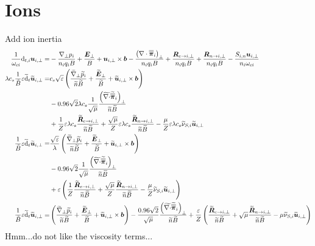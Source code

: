 \section{Ions}
%
Add ion inertia
%
\begin{align*}
 \frac{1}{\om_{ci}}\d_{t,i} \ve{u}_{i,\perp}
 =&
 - \frac{ \grad_\perp p_i }{n_i  q_i B}
 + \frac{\ve{E}_\perp}{B}
 + \ve{u}_{i,\perp}\times\ve{b}
 - \frac{ \L(\div\te{\pi}_i\R)_\perp }{n_i  q_i B}
 + \frac{ \ve{R}_{e \to i,\perp} }{n_i q_i B}
 + \frac{ \ve{R}_{n \to i,\perp} }{n_i q_i B}
 - \frac{ S_{i,n}\ve{u}_{i,\perp} }{n_i \om_{ci}}
 \\
 \lambda c_s
 \frac{1}{\tilde{B}}
 \e \wt{\d}_{t}\wt{\ve{u}}_{i,\perp}
 =&
c_s
\sqrt{\e}
\L(
\frac{ \wt{\grad}_\perp \wt{p}_i}{\wt{n} \wt{B}}
+
\frac{\wt{\ve{E}}_\perp}{\wt{B}}
+
\wt{\ve{u}}_{i,\perp}\times\ve{b}
\R)
\\ &
-
0.96\sqrt{2} \lambda c_s \frac{1}{\sqrt{\mu}} \frac{\L(\wt{\div}\wt{\te{\pi}}_i\R)_\perp}{\wt{n}\wt{B}}
\\ &
+ \frac{1}{Z}\e\lambda c_s \frac{\wt{\ve{R}}_{e \to i,\perp} }{\wt{n}\wt{B}}
 + \frac{\sqrt{\mu}}{Z} \e \lambda c_s \frac{\wt{\ve{R}}_{n \to i,\perp} }{\wt{n} \wt{B}}
 - \frac{\mu}{Z} \e\lambda c_s \wt{\nu}_{S,i}\wt{\ve{u}}_{i,\perp}
 \\
 \frac{1}{\tilde{B}}
 \e \wt{\d}_{t}\wt{\ve{u}}_{i,\perp}
 =&
\frac{\sqrt{\e}}{\lambda}
\L(
\frac{ \wt{\grad}_\perp \wt{p}_i}{\wt{n} \wt{B}}
+
\frac{\wt{\ve{E}}_\perp}{\wt{B}}
+
\wt{\ve{u}}_{i,\perp}\times\ve{b}
\R)
\\ &
-
0.96\sqrt{2} \frac{1}{\sqrt{\mu}} \frac{\L(\wt{\div}\wt{\te{\pi}}_i\R)_\perp}{\wt{n}\wt{B}}
\\ &
+ \e\L(\frac{1}{Z} \frac{\wt{\ve{R}}_{e \to i,\perp} }{\wt{n}\wt{B}}
+ \frac{\sqrt{\mu}}{Z}   \frac{\wt{\ve{R}}_{n \to i,\perp} }{\wt{n} \wt{B}}
- \frac{\mu}{Z}  \wt{\nu}_{S,i}\wt{\ve{u}}_{i,\perp}\R)
\\
 \frac{1}{\tilde{B}}
 \e \wt{\d}_{t}\wt{\ve{u}}_{i,\perp}
 =&
\L(
\frac{ \wt{\grad}_\perp \wt{p}_i}{\wt{n} \wt{B}}
+
\frac{\wt{\ve{E}}_\perp}{\wt{B}}
+
\wt{\ve{u}}_{i,\perp}\times\ve{b}
\R)
-
\frac{0.96\sqrt{2}}{\sqrt{\mu}} \frac{\L(\wt{\div}\wt{\te{\pi}}_i\R)_\perp}{\wt{n}\wt{B}}
+ \frac{\e}{Z}\L( \frac{\wt{\ve{R}}_{e \to i,\perp} }{\wt{n}\wt{B}}
+ \sqrt{\mu}   \frac{\wt{\ve{R}}_{n \to i,\perp} }{\wt{n} \wt{B}}
- \mu  \wt{\nu}_{S,i}\wt{\ve{u}}_{i,\perp}\R)
\end{align*}
%
Hmm...do not like the viscosity terms...
